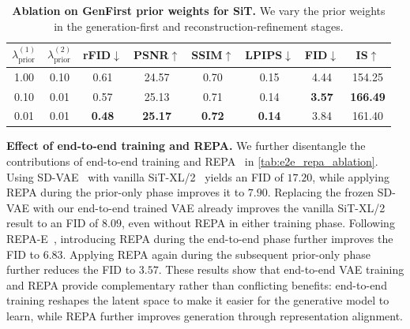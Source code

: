 \begin{table}[t]
\centering
\scriptsize
\caption{
\textbf{Ablation on GenFirst prior weights for SiT.}
We vary the prior weights in the generation-first and reconstruction-refinement stages.
}
\label{tab:sit_prior_weights}
\setlength{\tabcolsep}{4.5pt}

\begin{tabular}{cc|cccccc}
\toprule
$\lambda_{\mathrm{prior}}^{(1)}$
& $\lambda_{\mathrm{prior}}^{(2)}$
& rFID$\downarrow$
& PSNR$\uparrow$
& SSIM$\uparrow$
& LPIPS$\downarrow$
& FID$\downarrow$
& IS$\uparrow$ \\
\midrule
1.00
& 0.10
& 0.61
& 24.57
& 0.70
& 0.15
& 4.44
& 154.25 \\
0.10
& 0.01
& 0.57
& 25.13
& 0.71
& 0.14
& \textbf{3.57}
& \textbf{166.49} \\
0.01
& 0.01
& \textbf{0.48}
& \textbf{25.17}
& \textbf{0.72}
& \textbf{0.14}
& 3.84
& 161.40 \\
\bottomrule
\end{tabular}
\end{table}

\textbf{Effect of end-to-end training and REPA.}
We further disentangle the contributions of end-to-end training and REPA~\cite{repa} in \cref{tab:e2e_repa_ablation}.
Using SD-VAE~\cite{ldm} with vanilla SiT-XL/2~\cite{sit} yields an FID of $17.20$, while applying REPA during the prior-only phase improves it to $7.90$.
Replacing the frozen SD-VAE with our end-to-end trained VAE already improves the vanilla SiT-XL/2 result to an FID of $8.09$, even without REPA in either training phase.
Following REPA-E~\cite{repa_e}, introducing REPA during the end-to-end phase further improves the FID to 6.83.
Applying REPA again during the subsequent prior-only phase further reduces the FID to $3.57$.
These results show that end-to-end VAE training and REPA provide complementary rather than conflicting benefits: end-to-end training reshapes the latent space to make it easier for the generative model to learn, while REPA further improves generation through representation alignment.

